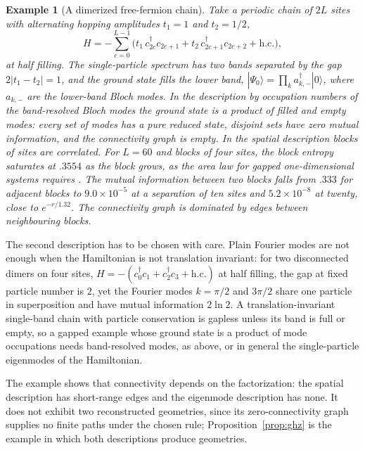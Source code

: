 \documentclass[12pt,a4paper]{article}
\newtheorem{example}[theorem]{Example}
\begin{document}
\begin{example}[A dimerized free-fermion chain]
\label{ex:fermion}
Take a periodic chain of $2L$ sites with alternating hopping amplitudes $t_1=1$ and $t_2=1/2$,
\[
H=-\sum_{c=0}^{L-1}\bigl(t_1\,c_{2c}^\dagger c_{2c+1}+t_2\,c_{2c+1}^\dagger c_{2c+2}+\mathrm{h.c.}\bigr),
\]
at half filling. The single-particle spectrum has two bands separated by the gap $2|t_1-t_2|=1$, and the ground state fills the lower band, $|\Psi_0\rangle=\prod_k a_{k,-}^\dagger|0\rangle$, where $a_{k,-}$ are the lower-band Bloch modes. In the description by occupation numbers of the band-resolved Bloch modes the ground state is a product of filled and empty modes: every set of modes has a pure reduced state, disjoint sets have zero mutual information, and the connectivity graph is empty. In the spatial description blocks of sites are correlated. For $L=60$ and blocks of four sites, the block entropy saturates at $.3554$ as the block grows, as the area law for gapped one-dimensional systems requires \cite{Hastings2007,Eisert2010}. The mutual information between two blocks falls from $.333$ for adjacent blocks to $9.0\times10^{-5}$ at a separation of ten sites and $5.2\times10^{-8}$ at twenty, close to $e^{-r/1.32}$. The connectivity graph is dominated by edges between neighbouring blocks.
\end{example}

The second description has to be chosen with care. Plain Fourier modes are not enough when the Hamiltonian is not translation invariant: for two disconnected dimers on four sites, $H=-(c_0^\dagger c_1+c_2^\dagger c_3+\mathrm{h.c.})$ at half filling, the gap at fixed particle number is $2$, yet the Fourier modes $k=\pi/2$ and $3\pi/2$ share one particle in superposition and have mutual information $2\ln2$. A translation-invariant single-band chain with particle conservation is gapless unless its band is full or empty, so a gapped example whose ground state is a product of mode occupations needs band-resolved modes, as above, or in general the single-particle eigenmodes of the Hamiltonian.

The example shows that connectivity depends on the factorization: the spatial description has short-range edges and the eigenmode description has none. It does not exhibit two reconstructed geometries, since its zero-connectivity graph supplies no finite paths under the chosen rule; Proposition~\ref{prop:ghz} is the example in which both descriptions produce geometries.
\end{document}
